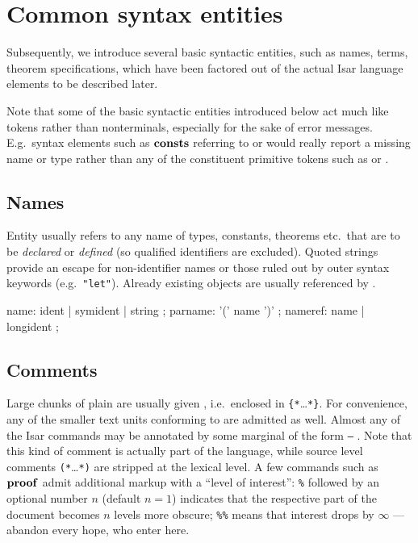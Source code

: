 \section{Common syntax entities}

Subsequently, we introduce several basic syntactic entities, such as names,
terms, theorem specifications, which have been factored out of the actual Isar
language elements to be described later.

Note that some of the basic syntactic entities introduced below act much like
tokens rather than nonterminals, especially for the sake of error messages.
E.g.\ syntax elements such as ${\mathord{\mathbf{consts}}}$ referring to  or
 would really report a missing name or type rather than any
of the constituent primitive tokens such as  or
.


\subsection{Names}

Entity  usually refers to any name of types, constants,
theorems etc.\ that are to be \emph{declared} or \emph{defined} (so qualified
identifiers are excluded).  Quoted strings provide an escape for
non-identifier names or those ruled out by outer syntax keywords (e.g.\ 
\verb|"let"|).  Already existing objects are usually referenced by
\railqtoken{nameref}.

\begin{rail}
  name: ident | symident | string
  ;
  parname: '(' name ')'
  ;
  nameref: name | longident
  ;
\end{rail}


\subsection{Comments}\label{sec:comments}

Large chunks of plain  are usually given
, i.e.\ enclosed in \verb|{*|\dots\verb|*}|.  For
convenience, any of the smaller text units conforming to 
are admitted as well.  Almost any of the Isar commands may be annotated by
some marginal \railnonterm{comment} of the form \texttt{--} .
Note that this kind of comment is actually part of the language, while source
level comments \verb|(*|\dots\verb|*)| are stripped at the lexical level.  A
few commands such as ${\mathord{\mathbf{proof}}}$ admit additional markup with a ``level of
interest'': \texttt{\%} followed by an optional number $n$ (default $n = 1$)
indicates that the respective part of the document becomes $n$ levels more
obscure; \texttt{\%\%} means that interest drops by $\infty$ --- abandon every
hope, who enter here.

